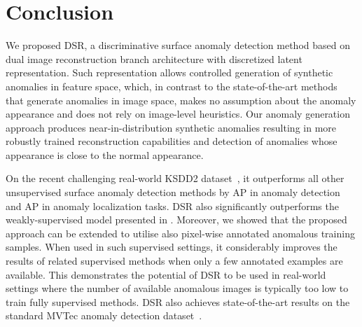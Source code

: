 \documentclass[runningheads]{llncs}
\begin{document}
\begin{table}
\centering
{}
\caption{Ablation study results on MVTec: (a) using out-of-distribution texture-based anomalies (DSR) in training; (b) unconstrained uniform anomaly sampling (DSR); (c) training with only image reconstruction loss (DSR) and with only the feature reconstruction loss (DSR); (d) Performance without the Upsampling module (DSR).
}
\label{tab:ablation}
\end{table}


\section{Conclusion}

We proposed DSR, a discriminative surface anomaly detection method based on dual image reconstruction branch architecture with discretized latent representation. Such representation allows controlled generation of synthetic anomalies in feature space, which, in contrast to the state-of-the-art methods that generate anomalies in image space, makes no assumption about the anomaly appearance and does not rely on image-level heuristics. Our anomaly generation approach produces near-in-distribution synthetic anomalies resulting in more robustly trained reconstruction capabilities and detection of anomalies whose appearance is close to the normal appearance. 

On the recent challenging real-world KSDD2 dataset~\cite{bovzivc2021mixed}, it outperforms all other unsupervised surface anomaly detection methods by  AP in anomaly detection and  AP in anomaly localization tasks. DSR also significantly outperforms the weakly-supervised model presented in \cite{bovzivc2021mixed}. Moreover, we showed that the proposed approach can be extended to utilise also pixel-wise annotated  anomalous training samples. When used in such supervised settings, it considerably improves the results of related supervised methods \cite{bovzivc2021mixed} when only a few annotated examples are available. This demonstrates the potential of DSR to be used in real-world settings where the number of available anomalous images is typically too low to train fully supervised methods. DSR also achieves state-of-the-art results on the standard MVTec anomaly detection dataset~\cite{bergmann2019mvtec}.
\end{document}
